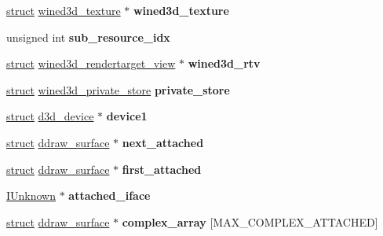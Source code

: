\begin{DoxyCompactItemize}
\hyperlink{interfacestruct}{struct} \hyperlink{structwined3d__texture}{wined3d\+\_\+texture} $\ast$ {\bfseries wined3d\+\_\+texture}
\item 
\mbox{\label{structddraw__surface_abb05e7c64a53c24ec8c24dcbe590803c}} 
unsigned int {\bfseries sub\+\_\+resource\+\_\+idx}
\item 
\mbox{\label{structddraw__surface_a9c3e57de6218d9510d5ee1ea0cdda469}} 
\hyperlink{interfacestruct}{struct} \hyperlink{structwined3d__rendertarget__view}{wined3d\+\_\+rendertarget\+\_\+view} $\ast$ {\bfseries wined3d\+\_\+rtv}
\item 
\mbox{\label{structddraw__surface_a850b8bdc64153c2f14087b7a3db0f96e}} 
\hyperlink{interfacestruct}{struct} \hyperlink{structwined3d__private__store}{wined3d\+\_\+private\+\_\+store} {\bfseries private\+\_\+store}
\item 
\mbox{\label{structddraw__surface_ac48902a68ef26b7cbf952bac469bb54e}} 
\hyperlink{interfacestruct}{struct} \hyperlink{structd3d__device}{d3d\+\_\+device} $\ast$ {\bfseries device1}
\item 
\mbox{\label{structddraw__surface_acca52fd165f5e82be0e0d5381ed1499e}} 
\hyperlink{interfacestruct}{struct} \hyperlink{structddraw__surface}{ddraw\+\_\+surface} $\ast$ {\bfseries next\+\_\+attached}
\item 
\mbox{\label{structddraw__surface_a9a13405eed54efae2dd8d3012edd63a3}} 
\hyperlink{interfacestruct}{struct} \hyperlink{structddraw__surface}{ddraw\+\_\+surface} $\ast$ {\bfseries first\+\_\+attached}
\item 
\mbox{\label{structddraw__surface_a799fc91d52251a38d59104a335fa2f7a}} 
\hyperlink{interface_i_unknown}{I\+Unknown} $\ast$ {\bfseries attached\+\_\+iface}
\item 
\mbox{\label{structddraw__surface_af03e28a144fef63b513e7825d2e9d720}} 
\hyperlink{interfacestruct}{struct} \hyperlink{structddraw__surface}{ddraw\+\_\+surface} $\ast$ {\bfseries complex\+\_\+array} \mbox{[}M\+A\+X\+\_\+\+C\+O\+M\+P\+L\+E\+X\+\_\+\+A\+T\+T\+A\+C\+H\+ED\mbox{]}

\end{DoxyCompactItemize}
